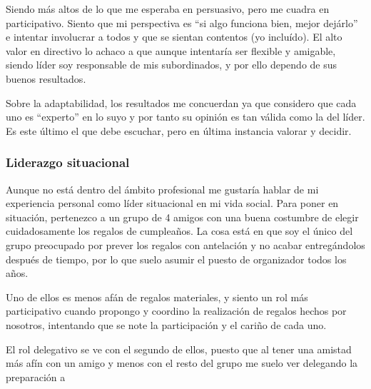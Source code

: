 Siendo más altos de lo que me esperaba en persuasivo, pero me cuadra en participativo. Siento que mi perspectiva es ``si algo funciona bien, mejor dejárlo'' e intentar involucrar a todos y que se sientan contentos (yo incluído). El alto valor en directivo lo achaco a que aunque intentaría ser flexible y amigable, siendo líder soy responsable de mis subordinados, y por ello dependo de sus buenos resultados.

Sobre la adaptabilidad, los resultados me concuerdan ya que considero que cada uno es ``experto'' en lo suyo y por tanto su opinión es tan válida como la del líder. Es este último el que debe escuchar, pero en última instancia valorar y decidir.

\subsubsection{Liderazgo situacional}


Aunque no está dentro del ámbito profesional me gustaría hablar de mi experiencia personal como líder situacional en mi vida social. 
Para poner en situación, pertenezco a un grupo de 4 amigos con una buena costumbre de elegir cuidadosamente los regalos de cumpleaños. La cosa está en que soy el único del grupo preocupado por prever los regalos con antelación y no acabar entregándolos después de tiempo, por lo que suelo asumir el puesto de organizador todos los años.

Uno de ellos es menos afán de regalos materiales, y siento un rol más participativo cuando propongo y coordino la realización de regalos hechos por nosotros, intentando que se note la participación y el cariño de cada uno.

El rol delegativo se ve con el segundo de ellos, puesto que al tener una amistad más afín con un amigo y menos con el resto del grupo me suelo ver delegando la preparación a



